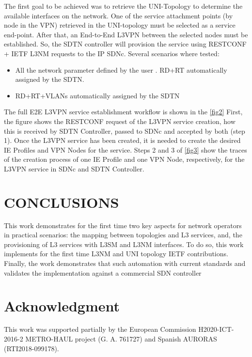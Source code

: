 \documentclass[conference]{IEEEtran}
\begin{document}
The first goal to be achieved was to retrieve the UNI-Topology to determine the available interfaces on the network. One of the service attachment points (by node in the VPN) retrieved  in the UNI-topology must be selected as a service end-point. After that, an End-to-End L3VPN between the selected nodes must be established. So, the SDTN controller will provision the service using RESTCONF + IETF L3NM requests to the IP SDNc. Several scenarios where tested:
\begin{itemize}
    \item All the network parameter defined by the user . 
    \itme RD+RT automatically assigned by the SDTN. 
    \item RD+RT+VLANs automatically assigned by the SDTN
\end{itemize}

The full E2E L3VPN service establishment workflow is shown in the \ref{fig2} First, the figure shows the RESTCONF request of the L3VPN service creation, how this is received by SDTN Controller, passed to SDNc and accepted by both (step 1). Once the L3VPN service has been created, it is needed to create the desired IE Profiles and VPN Nodes for the service. 
Steps 2 and 3 of \ref{fig3} show the traces of the creation process of one IE Profile and one VPN Node, respectively, for the L3VPN service in SDNc and SDTN Controller.

\section{CONCLUSIONS}

This work demonstrates for the first time two key aspects for network operators in practical scenarios: the mapping between topologies and L3 services, and,  the provisioning of L3 services with L3SM and L3NM interfaces. To do so, this work  implements for the first time L3NM and UNI topology IETF contributions. Finally, the work demonstrates that such automation with current standards and validates the implementation against a commercial SDN controller

\section*{Acknowledgment}
This work was supported partially by the European Commission H2020-ICT-2016-2 METRO-HAUL project (G. A. 761727) and Spanish AURORAS (RTI2018-099178).
\end{document}
